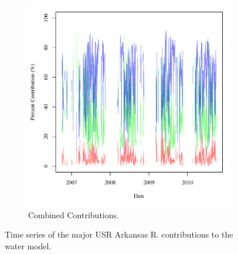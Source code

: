 \begin{linenumbers}
\begin{figure}[htbp]
\begin{subfigure}{0.5\textwidth}
		\label{sub:USRWAtm}
	\end{subfigure}%
	\begin{subfigure}{0.5\textwidth}
		\centering
		\includegraphics[width=0.9\linewidth]{"Figures/Results_USR/M Water Contrib 4"}
		\caption{Combined Contributions.}
		\label{sub:USRWComb}
	\end{subfigure}
	\caption[Time series of the major USR Arkansas R. contributions to the water model.]{Time series of the major USR Arkansas R. contributions to the water model.}
	\label{fig:USRWaterContrib}
\end{figure}


\end{linenumbers}
